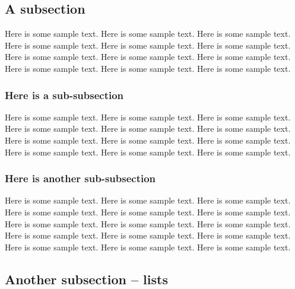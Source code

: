 \subsection{A subsection}

Here is some sample text. Here is some sample text. Here is some sample
text. Here is some sample text. Here is some sample text. Here is some
sample text. Here is some sample text. Here is some sample text. Here is
some sample text. Here is some sample text. Here is some sample text.
Here is some sample text.

\subsubsection{Here is a sub-subsection}

Here is some sample text. Here is some sample text. Here is some sample
text. Here is some sample text. Here is some sample text. Here is some
sample text. Here is some sample text. Here is some sample text. Here is
some sample text. Here is some sample text. Here is some sample text.
Here is some sample text.

\subsubsection{Here is another sub-subsection}

Here is some sample text. Here is some sample text. Here is some sample
text. Here is some sample text. Here is some sample text. Here is some
sample text. Here is some sample text. Here is some sample text. Here is
some sample text. Here is some sample text. Here is some sample text.
Here is some sample text. Here is some sample text. Here is some sample
text. Here is some sample text.

\subsection{Another subsection -- lists}


